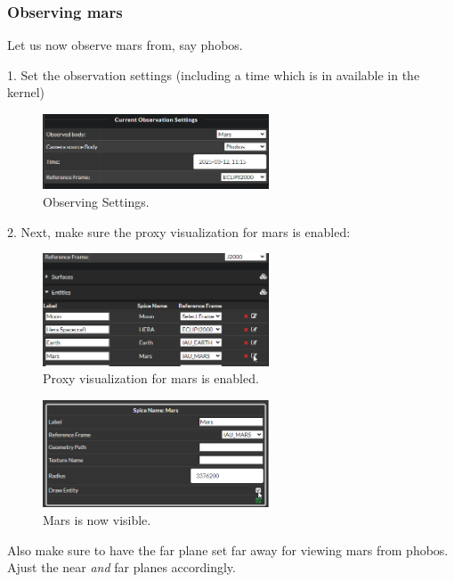 \hypertarget{observing-mars}{%
	\subsubsection{Observing mars}\label{observing-mars}}

Let us now observe mars from, say phobos.

1. Set the observation settings (including a time which is in available in the kernel)

\begin{figure}[h!]
	\centering
	\includegraphics[width=0.6\textwidth]{pics/observe.png}
	\caption{Observing Settings.}
\end{figure}

2. Next, make sure the proxy visualization for mars is enabled:

\begin{figure}[h!]
	\centering
	\includegraphics[width=0.6\textwidth]{./pics/MarsProperties.png}
	\caption{Proxy visualization for mars is enabled.}
\end{figure}

\begin{figure}[h!]
	\centering
	\includegraphics[width=0.6\textwidth]{./pics/visibleMars.png}
	\caption{Mars is now visible.}
\end{figure}

Also make sure to have the far plane set far away for viewing mars from
phobos. Ajust the near \emph{and} far planes accordingly.

